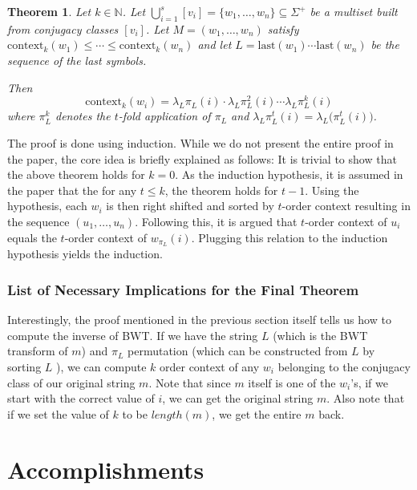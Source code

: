 \documentclass[11pt,letterpaper,]{article}
\newtheorem{theorem}{Theorem}
\begin{document}
\begin{theorem}
\newcommand*{\context}[2]{\ensuremath{\mathrm{context}_{#1}(#2)}}
\newcommand*{\last}[1]{\ensuremath{\mathrm{last}(#1)}}
Let $k \in \mathbb{N}$. Let
$\bigcup_{i=1}^s[v_i]=\{w_1,\ldots,w_n\}\subseteq\Sigma^+$ be a multiset built
from conjugacy classes $[v_i]$. Let $M=(w_1,\ldots,w_n)$ satisfy
$\context{k}{w_1}\leq\cdots\leq\context{k}{w_n}$ and let
$L=\last{w_1}\cdots\last{w_n}$ be the sequence of the last symbols.

Then
\[\context{k}{w_i}=\lambda_L\pi_L(i)\cdot\lambda_L\pi_L^2(i)\cdots\lambda_L\pi_L^k(i)\]
where $\pi_L^k$ denotes the $t$-fold application of $\pi_L$ and $\lambda_L\pi_L^t(i)=\lambda_L\big(\pi_L^t(i)\big)$.
\end{theorem}

The proof is done using induction. While we do not present the entire proof in
the paper, the core idea is briefly explained as follows: It is trivial to show
that the above theorem holds for $k=0$. As the induction hypothesis, it is
assumed in the paper that the for any $t \leq k$, the theorem holds for $t-1$.
Using the hypothesis, each $w_i$ is then right shifted and sorted by $t$-order
context resulting in the sequence $(u_1,\ldots,u_n)$. Following this, it is
argued that $t$-order context of $u_i$ equals the $t$-order context of
$w_{\pi_L}(i)$. Plugging this relation to the induction hypothesis yields the
induction.

\subsubsection{List of Necessary Implications for the Final Theorem}

Interestingly, the proof mentioned in the previous section itself tells us how
to compute the inverse of BWT. If we have the string $L$ (which is the BWT
transform of $m$) and $\pi_L$ permutation (which can be constructed from $L$ by
sorting $L$ ), we can compute $k$ order context of any $w_i$ belonging to the
conjugacy class of our original string $m$. Note that since $m$ itself is one
of the $w_i$'s, if we start with the correct value of $i$, we can get the
original string $m$. Also note that if we set the value of $k$ to be
$length(m)$, we get the entire $m$ back.

\section{Accomplishments}
\end{document}
